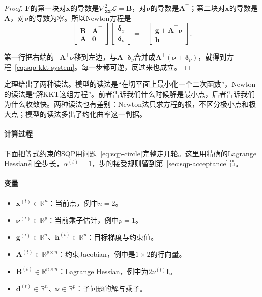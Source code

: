 \begin{proof}
$\bm{F}$的第一块对$\bm{x}$的导数是$\nabla^2_{\bm{x}\bm{x}}\mathcal{L}=\bm{B}$，对$\bm{\nu}$的导数是$\bm{A}^\top$；第二块对$\bm{x}$的导数是$\bm{A}$，对$\bm{\nu}$的导数为零。所以Newton方程是
\[
 \begin{bmatrix}\bm{B}&\bm{A}^\top\\\bm{A}&\bm{0}\end{bmatrix}
 \begin{bmatrix}\bm{\delta}_x\\\bm{\delta}_\nu\end{bmatrix}
 =-\begin{bmatrix}\bm{g}+\bm{A}^\top\bm{\nu}\\\bm{h}\end{bmatrix}.
\]

第一行把右端的$-\bm{A}^\top\bm{\nu}$移到左边，与$\bm{A}^\top\bm{\delta}_\nu$合并成$\bm{A}^\top(\bm{\nu}+\bm{\delta}_\nu)$，就得到方程~\eqref{eq:sqp-kkt-system}。每一步都可逆，反过来也成立。
\end{proof}

定理给出了两种读法。模型的读法是“在切平面上最小化一个二次函数”，Newton的读法是“解KKT这组方程”。前者告诉我们什么时候解是最小点，后者告诉我们为什么收敛快。两种读法也有差别：Newton法只求方程的根，不区分极小点和极大点；模型的读法多出了约化曲率这一判据。

\paragraph{计算过程}
下面把等式约束的SQP用问题~\eqref{eq:sqp-circle}完整走几轮。这里用精确的Lagrange Hessian和全步长，$\alpha^{(t)}=1$，步的接受规则留到第~\ref{sec:sqp-acceptance}节。

\paragraph{变量}
\begin{itemize}
 \item $\bm{x}^{(t)}\in\mathbb{R}^n$：当前点，例中$n=2$。
 \item $\bm{\nu}^{(t)}\in\mathbb{R}^p$：当前乘子估计，例中$p=1$。
 \item $\bm{g}^{(t)}\in\mathbb{R}^n$、$\bm{h}^{(t)}\in\mathbb{R}^p$：目标梯度与约束值。
 \item $\bm{A}^{(t)}\in\mathbb{R}^{p\times n}$：约束Jacobian，例中是$1\times2$的行向量。
 \item $\bm{B}^{(t)}\in\mathbb{R}^{n\times n}$：Lagrange Hessian，例中为$2\nu^{(t)}\bm{I}$。
 \item $\bm{d}^{(t)}\in\mathbb{R}^n$、$\hat{\bm{\nu}}\in\mathbb{R}^p$：子问题的解与乘子。
\end{itemize}

